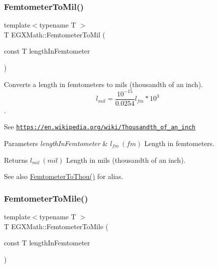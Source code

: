 \subsubsection{\texorpdfstring{Femtometer\+To\+Mil()}{FemtometerToMil()}}
{\footnotesize\ttfamily template$<$typename T $>$ \\
T E\+G\+X\+Math\+::\+Femtometer\+To\+Mil (\begin{DoxyParamCaption}\item[{const T}]{length\+In\+Femtometer }\end{DoxyParamCaption})}



Converts a length in femtometers to mils (thousandth of an inch). \[ l_{mil}= \frac{10^{-15}}{0.0254} l_{fm} * 10^{3} \]. 

See \href{https://en.wikipedia.org/wiki/Thousandth_of_an_inch}{\tt https\+://en.\+wikipedia.\+org/wiki/\+Thousandth\+\_\+of\+\_\+an\+\_\+inch} 
\begin{DoxyParams}{Parameters}
{\em length\+In\+Femtometer} & $ l_{fm}\ (fm)$ Length in femtometers. \\
\hline
\end{DoxyParams}
\begin{DoxyReturn}{Returns}
$ l_{mil}\ (mil)$ Length in mils (thousandth of an inch). 
\end{DoxyReturn}
\begin{DoxySeeAlso}{See also}
\mbox{\hyperlink{group___e_g_x_math-_conversions-_length_conversions-_femtometer-_imperial_ga5c277d07215ad164ba2ad94e25b02ff1}{Femtometer\+To\+Thou()}} for alias. 
\end{DoxySeeAlso}
\mbox{\label{group___e_g_x_math-_conversions-_length_conversions-_femtometer-_imperial_ga8973c4ada3a3bc89034978a0ba7c2693}} 
\subsubsection{\texorpdfstring{Femtometer\+To\+Mile()}{FemtometerToMile()}}
{\footnotesize\ttfamily template$<$typename T $>$ \\
T E\+G\+X\+Math\+::\+Femtometer\+To\+Mile (\begin{DoxyParamCaption}\item[{const T}]{length\+In\+Femtometer }\end{DoxyParamCaption})}



